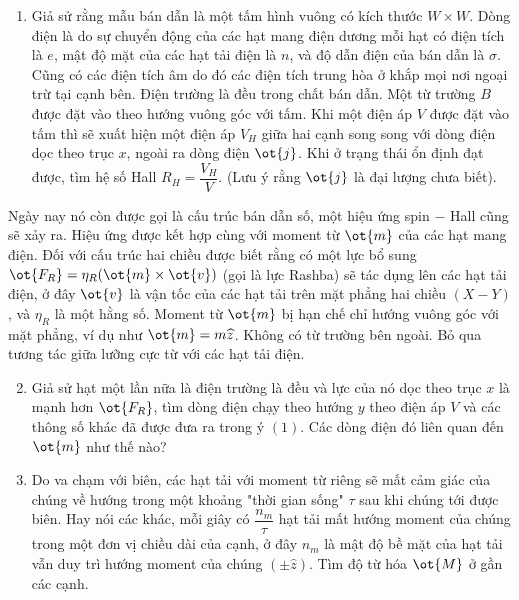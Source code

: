 \begin{vd}
\begin{center}
\begin{tikzpicture}[x=0.75pt,y=0.75pt,yscale=-1,xscale=1]
\end{tikzpicture}
\end{center}
\begin{enumerate}[1) ]
    \item  Giả sử rằng mẫu bán dẫn là một tấm hình vuông có kích thước $W\times W$. Dòng điện là do sự chuyển động của các hạt mang điện dương mỗi hạt có điện tích là $e$, mật độ mặt của các hạt tải điện là $n$, và độ dẫn điện của bán dẫn là $\sigma$. Cũng có các điện tích âm do đó các điện tích trung hòa ở khắp mọi nơi ngoại trừ tại cạnh bên. Điện trường là đều trong chất bán dẫn. Một từ trường $B$ được đặt vào theo hướng vuông góc với tấm. Khi một điện áp $V$ được đặt vào tấm thì sẽ xuất hiện một điện áp $V_{H}$ giữa hai cạnh song song với dòng điện dọc theo trục $x$, ngoài ra dòng điện $\ot{j}$. Khi ở trạng thái ổn định đạt được, tìm hệ số Hall $R_{H}=\dfrac{V_{H}}{V}$. (Lưu ý rằng $\ot{j}$ là đại lượng chưa biết).
\end{enumerate}
Ngày nay nó còn được gọi là cấu trúc bán dẫn số, một hiệu ứng spin $-$ Hall cũng sẽ xảy ra. Hiệu ứng được kết hợp cùng với moment từ $\ot{m}$ của các hạt mang điện. Đối với cấu trúc hai chiều được biết rằng có một lực bổ sung $\ot{F_{R}}=\eta_{R}(\ot{m}\times\ot{v})$ (gọi là lực Rashba) sẽ tác dụng lên các hạt tải điện, ở đây $\ot{v}$ là vận tốc của các hạt tải trên mặt phẳng hai chiều $(X-Y)$, và $\eta_{R}$ là một hằng số. Moment từ $\ot{m}$ bị hạn chế chỉ hướng vuông góc với mặt phẳng, ví dụ như $\ot{m}=m\widehat{z}$. Không có từ trường bên ngoài. Bỏ qua tương tác giữa lưỡng cực từ với các hạt tải điện.
\begin{enumerate}[1)]
\setcounter{enumi}{1}
    \item Giả sử hạt một lần nữa là điện trường là đều và lực của nó dọc theo trục $x$ là mạnh hơn $\ot{F_{R}}$, tìm dòng điện chạy theo hướng $y$ theo điện áp $V$ và các thông số khác đã được đưa ra trong ý $(1)$. Các dòng điện đó liên quan đến $\ot{m}$ như thế nào? 
    \item Do va chạm với biên, các hạt tải với moment từ riêng sẽ mất cảm giác của chúng về hướng trong một khoảng "thời gian sống" $\tau$ sau khi chúng tới được biên. Hay nói các khác, mỗi giây có $\dfrac{n_{m}}{\tau}$ hạt tải mất hướng moment của chúng trong một đơn vị chiều dài của cạnh, ở đây $n_{m}$ là mật độ bề mặt của hạt tải vẫn duy trì hướng moment của chúng $(\pm \widehat{z})$. Tìm độ từ hóa $\ot{M}$ ở gần các cạnh.
\end{enumerate}
\end{vd}
